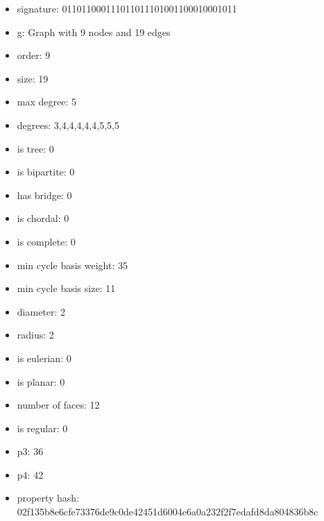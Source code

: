 \newpage
\begin{figure}
\end{figure}
\begin{itemize}
\item signature: 011011000111011011101001100010001011
\item g: Graph with 9 nodes and 19 edges
\item order: 9
\item size: 19
\item max degree: 5
\item degrees: 3,4,4,4,4,4,5,5,5
\item is tree: 0
\item is bipartite: 0
\item has bridge: 0
\item is chordal: 0
\item is complete: 0
\item min cycle basis weight: 35
\item min cycle basis size: 11
\item diameter: 2
\item radius: 2
\item is eulerian: 0
\item is planar: 0
\item number of faces: 12
\item is regular: 0
\item p3: 36
\item p4: 42
\item property hash: 02f135b8e6cfe73376de9c0de42451d6004e6a0a232f2f7edafd8da804836b8c
\end{itemize}
